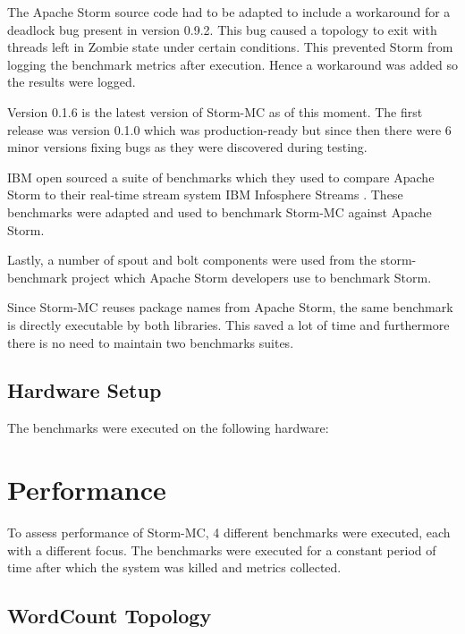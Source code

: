 The Apache Storm source code had to be adapted to include a workaround for a deadlock bug present in version 0.9.2. This bug caused a topology to exit with threads left in Zombie state under certain conditions. This prevented Storm from logging the benchmark metrics after execution. Hence a workaround was added so the results were logged.

Version 0.1.6 is the latest version of Storm-MC as of this moment. The first release was version 0.1.0 which was production-ready but since then there were 6 minor versions fixing bugs as they were discovered during testing.

IBM open sourced a suite of benchmarks which they used to compare Apache Storm to their real-time stream system IBM Infosphere Streams \citep{InfoSphereStreams}. These benchmarks were adapted and used to benchmark Storm-MC against Apache Storm.

Lastly, a number of spout and bolt components were used from the storm-benchmark project which Apache Storm developers use to benchmark Storm.

Since Storm-MC reuses package names from Apache Storm, the same benchmark is directly executable by both libraries. This saved a lot of time and furthermore there is no need to maintain two benchmarks suites.


\subsection{Hardware Setup}

The benchmarks were executed on the following hardware:


\section{Performance}
\label{sec:performance}


To assess performance of Storm-MC, 4 different benchmarks were executed, each with a different focus. The benchmarks were executed for a constant period of time after which the system was killed and metrics collected.

\subsection{WordCount Topology}

